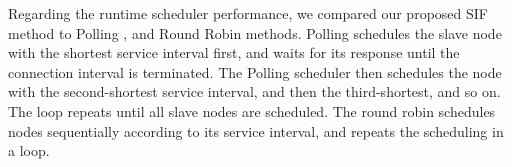 \documentclass[10pt,journal,compsoc]{IEEEtran}
\begin{document}
Regarding the runtime scheduler performance, we compared our proposed SIF method to Polling \cite{jacob2015energy}, and Round Robin \cite{ergen2010tdma} methods.
Polling schedules the slave node with the shortest service interval first, and waits for its response until the connection interval is terminated. The Polling scheduler then schedules the node with the second-shortest service interval, and then the third-shortest, and so on. The loop repeats until all slave nodes are scheduled. The round robin schedules nodes sequentially according to its service interval, and repeats the scheduling in a loop.
\end{document}
